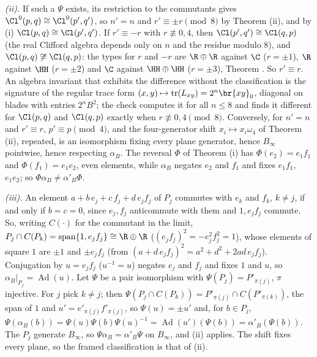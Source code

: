\emph{(ii).} If such a $\Psi$ exists, its restriction to the commutants gives $\Cl^{0}(p,q) \cong \Cl^{0}(p',q')$, so $n' = n$ and $r' \equiv \pm r \pmod 8$ by Theorem (ii), and by (i) $\Cl(p,q) \cong \Cl(p',q')$. If $r' \equiv -r$ with $r \not\equiv 0, 4$, then $\Cl(p',q') \cong \Cl(q,p)$ (the real Clifford algebra depends only on $n$ and the residue modulo $8$), and $\Cl(p,q) \not\cong \Cl(q,p)$: the types for $r$ and $-r$ are $\R \oplus \R$ against $\C$ ($r = \pm 1$), $\R$ against $\HH$ ($r = \pm 2$) and $\C$ against $\HH \oplus \HH$ ($r = \pm 3$), Theorem . So $r' \equiv r$. An algebra invariant that exhibits the difference without the classification is the signature of the regular trace form $(x,y) \mapsto \operatorname{tr}(L_{xy}) = 2^{n}\br{xy}_{0}$, diagonal on blades with entries $2^{n}B^{2}$; the check computes it for all $n \le 8$ and finds it different for $\Cl(p,q)$ and $\Cl(q,p)$ exactly when $r \not\equiv 0, 4 \pmod 8$. Conversely, for $n' = n$ and $r' \equiv r$, $p' \equiv p \pmod 4$, and the four-generator shift $x_{i} \mapsto x_{i}\omega_{4}$ of Theorem (ii), repeated, is an isomorphism fixing every plane generator, hence $B_{\infty}$ pointwise, hence respecting $\alpha_{B}$. The reversal $\Phi$ of Theorem (i) has $\Phi(e_{2}) = e_{1}f_{1}$ and $\Phi(f_{1}) = e_{1}e_{2}$, even elements, while $\alpha_{B}$ negates $e_{2}$ and $f_{1}$ and fixes $e_{1}f_{1}$, $e_{1}e_{2}$; so $\Phi\alpha_{B} \ne \alpha'_{B}\Phi$.

\emph{(iii).} An element $a + b\,e_{j} + c\,f_{j} + d\,e_{j}f_{j}$ of $P_{j}$ commutes with $e_{k}$ and $f_{k}$, $k \ne j$, if and only if $b = c = 0$, since $e_{j}, f_{j}$ anticommute with them and $1, e_{j}f_{j}$ commute. So, writing $C(\cdot)$ for the commutant in the limit, $P_{j} \cap C(P_{k}) = \mathrm{span}\{1, e_{j}f_{j}\} \cong \R \oplus \R$ ($(e_{j}f_{j})^{2} = -e_{j}^{2}f_{j}^{2} = 1$), whose elements of square $1$ are $\pm 1$ and $\pm e_{j}f_{j}$ (from $(a + d\,e_{j}f_{j})^{2} = a^{2} + d^{2} + 2ad\,e_{j}f_{j}$). Conjugation by $u = e_{j}f_{j}$ ($u^{-1} = u$) negates $e_{j}$ and $f_{j}$ and fixes $1$ and $u$, so $\alpha_{B}|_{P_{j}} = \operatorname{Ad}(u)$. Let $\Psi$ be a pair isomorphism with $\Psi(P_{j}) = P'_{\pi(j)}$, $\pi$ injective. For $j$ pick $k \ne j$; then $\Psi(P_{j} \cap C(P_{k})) = P'_{\pi(j)} \cap C(P'_{\pi(k)})$, the span of $1$ and $u' = e'_{\pi(j)}f'_{\pi(j)}$, so $\Psi(u) = \pm u'$ and, for $b \in P_{j}$, $\Psi(\alpha_{B}(b)) = \Psi(u)\Psi(b)\Psi(u)^{-1} = \operatorname{Ad}(u')(\Psi(b)) = \alpha'_{B}(\Psi(b))$. The $P_{j}$ generate $B_{\infty}$, so $\Psi\alpha_{B} = \alpha'_{B}\Psi$ on $B_{\infty}$, and (ii) applies. The shift fixes every plane, so the framed classification is that of (ii).

